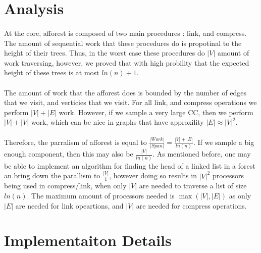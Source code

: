\documentclass[]{article}
\begin{document}
\section{Analysis}
\paragraph{}
At the core, afforest is composed of two main procedures : link, and compress. The amount of sequential work that  these procedures do is propotinal to the height of their trees. Thus, in the worst case these procedures do $|V|$ amount of work traversing, however, we proved that with high probility that the expected height of these trees is at most $ln(n) + 1$.

\paragraph{}
The amount of work that the afforest does is bounded by the number of edges that we visit, and verticies that we visit. For all link, and compress operations we perform $|V| + |E|$ work. However, if we sample a very large CC, then we perform $|V| + |V|$ work, which can be nice in graphs that have approxility $|E|\approx|V|^2$.

\paragraph{}
Therefore, the parralism of afforest is equal to $\frac{|Work|}{|Span|} = \frac{|V| + |E|}{ln(n)}$. If we sample a big enough component, then this may also be $\frac{|V|}{ln(n)}$. As mentioned before, one may be able to implement an algorithm for finding the head of a linked list in a forest an bring down the parallism to $\frac{|V|}{1}$, however doing so results in $|V|^2$ processors being used in compress/link, when only $|V|$ are needed to traverse a list of size $ln(n)$. The maximum amount of processors needed is $\max(|V|,|E|)$ as only $|E|$ are needed for link opeartions, and $|V|$ are needed for compress operations.
\section{Implementaiton Details}
\end{document}
